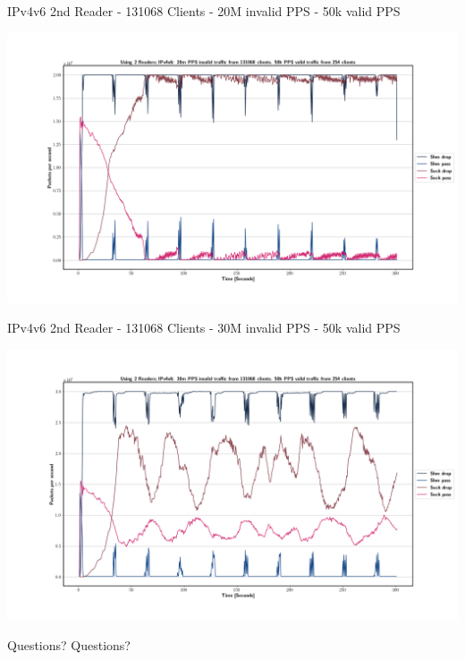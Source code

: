 \documentclass[11pt,english,table,dvipsnames]{beamer}
\begin{document}
\begin{frame}{IPv4v6 2nd Reader - 131068 Clients - 20M invalid PPS - 50k valid PPS}
    \begin{center}
        \includegraphics[width=1.\linewidth]{images/IPv4v6_20m_2ndReader_1.png}
    \end{center}
\end{frame}

\begin{frame}{IPv4v6 2nd Reader - 131068 Clients - 30M invalid PPS - 50k valid PPS}
    \begin{center}
        \includegraphics[width=1.\linewidth]{images/IPv4v6_30m_2ndReader_1.png}
    \end{center}
\end{frame}

\begin{frame}{Questions?}
    Questions?
\end{frame}

\cleardoublepage
\backupbegin
{}

\backupend
\end{document}

